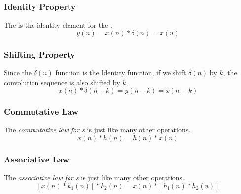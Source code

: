 \subsubsection{Identity Property}\label{subsubsec:Convolution_Property-Identity}
\begin{definition}\label{def:Convolution_Property-Identity}
  The  is the identity element for the .
  \begin{equation}\label{eq:Convolution_Property-Identity}
    y(n) = x(n) * \delta(n) = x(n)
  \end{equation}
\end{definition}

\subsubsection{Shifting Property}\label{subsubsec:Convolution_Property-Shifting}
\begin{definition}\label{def:Convolution_Property-Shifting}
  Since the $\delta(n)$ function is the Identity function, if we shift $\delta(n)$ by $k$, the convolution sequence is also shifted by $k$.
  \begin{equation}\label{eq:Convolution_Property-Shifting}
    x(n) * \delta(n-k) = y(n-k) = x(n-k)
  \end{equation}
\end{definition}

\subsubsection{Commutative Law}\label{subsubsec:Convolution_Property-Commutative}
\begin{definition}\label{def:Convolution_Property-Commutative}
  The \emph{commutative law for s} is just like many other operations.
  \begin{equation}\label{eq:Convolution_Property-Commutative}
    x(n) * h(n) = h(n) * x(n)
  \end{equation}
\end{definition}

\subsubsection{Associative Law}\label{subsubsec:Convolution_Property-Associative}
\begin{definition}\label{def:Convolution_Property-Associative}
  The \emph{associative law for s} is just like many other operations.
  \begin{equation}\label{eq:Convolution_Property-Associative}
    \left[ x(n) * h_{1}(n) \right] * h_{2}(n) = x(n) * \left[ h_{1}(n) * h_{2}(n) \right]
  \end{equation}
\end{definition}

